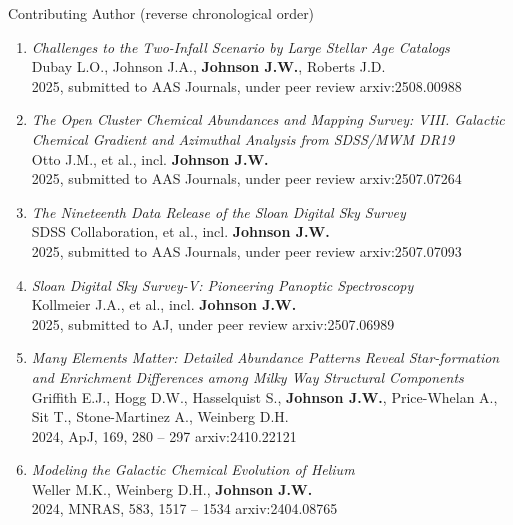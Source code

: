 \documentclass[cv.tex]{subfiles}
\begin{document}
\par\noindent
{\color{themecolor} \large Contributing Author}
(reverse chronological order)
\par\noindent
\begin{enumerate}

	\vspace{-3mm}

	\item \textit{Challenges to the Two-Infall Scenario by Large Stellar Age Catalogs}
	\\
	Dubay L.O., Johnson J.A., \textbf{Johnson J.W.}, Roberts J.D.
	\\
	2025, submitted to AAS Journals, under peer review \hfill arxiv:2508.00988

	\item \textit{The Open Cluster Chemical Abundances and Mapping Survey: VIII.
	Galactic Chemical Gradient and Azimuthal Analysis from SDSS/MWM DR19}
	\\
	Otto J.M., et al., incl. \textbf{Johnson J.W.}
	\\
	2025, submitted to AAS Journals, under peer review \hfill arxiv:2507.07264

	\item \textit{The Nineteenth Data Release of the Sloan Digital Sky Survey}
	\\
	SDSS Collaboration, et al., incl. \textbf{Johnson J.W.}
	\\
	2025, submitted to AAS Journals, under peer review \hfill arxiv:2507.07093

	\item \textit{Sloan Digital Sky Survey-V: Pioneering Panoptic Spectroscopy}
	\\
	Kollmeier J.A., et al., incl. \textbf{Johnson J.W.}
	\\
	2025, submitted to AJ, under peer review \hfill arxiv:2507.06989

	\item \textit{Many Elements Matter: Detailed Abundance Patterns Reveal
	Star-formation and Enrichment Differences among Milky Way Structural
	Components}
	\\
	Griffith E.J., Hogg D.W., Hasselquist S., \textbf{Johnson J.W.},
	Price-Whelan A., Sit T., Stone-Martinez A., Weinberg D.H.
	\\
	2024, ApJ, 169, 280 -- 297 \hfill arxiv:2410.22121

	\item \textit{Modeling the Galactic Chemical Evolution of Helium}
	\\
	Weller M.K., Weinberg D.H., \textbf{Johnson J.W.}
	\\
	2024, MNRAS, 583, 1517 -- 1534 \hfill arxiv:2404.08765


\end{enumerate}
\end{document}

